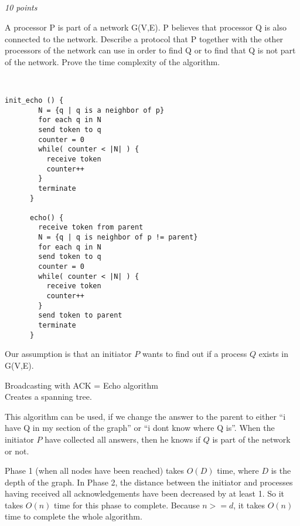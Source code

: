 \documentclass[a4paper]{article}
\newcommand{\points}[1]{\subsection{} \textit{#1 points}\\}
\newcommand{\question}[2][]{
  \parbox[t]{\textwidth}{
    \ifthenelse{\equal{#1}{}}{}{#1)}
    \parbox[t]{0.95\textwidth}{#2}}\\}
\newcommand{\solution}[2][]{
  \ifthenelse{\equal{#1}{} \or \equal{#1}{a}}{\\[3pt]\textit{Solution: }\\[0.1cm]}{}
  \parbox[t]{\textwidth}{
    \ifthenelse{\equal{#1}{}}{}{#1)}
    \parbox[t]{0.95\textwidth}{#2}}\\
}
\begin{document}
\points{10}
\question{
  A processor P is part of a network G(V,E). P believes that processor
  Q is also connected to the network. Describe a protocol that P
  together with the other processors of the network can use in order to
  find Q or to find that Q is not part of the network. Prove the time
  complexity of the algorithm.
}
%
\begin{lrbox}{\userinput}
  \begin{minipage}{\linewidth}
    \begin{lstlisting}[mathescape]
      init_echo () {
        N = {q | q is a neighbor of p}
        for each q in N
        send token to q
        counter = 0
        while( counter < |N| ) {
          receive token
          counter++
        }
        terminate
      }

      echo() {
        receive token from parent
        N = {q | q is neighbor of p != parent}
        for each q in N
        send token to q
        counter = 0
        while( counter < |N| ) {
          receive token
          counter++
        }
        send token to parent
        terminate
      }
    \end{lstlisting}
  \end{minipage}
\end{lrbox}
%
\solution{
  Our assumption is that an initiator $P$ wants to find out if a
  process $Q$ exists in G(V,E).


  Broadcasting with ACK = Echo algorithm\\
  Creates a spanning tree.

  \usebox{\userinput}

  This algorithm can be used, if we change the answer to the parent to
  either ``i have Q in my section of the graph'' or ``i dont know
  where Q is''.
  When the initiator $P$ have collected all answers, then he knows if
  $Q$ is part of the network or not.

  Phase 1 (when all nodes have been reached) takes $O(D)$ time, where
  $D$ is the depth of the graph. In Phase 2, the distance between the
  initiator and processes having received all acknowledgements have been
  decreased by at least 1. So it takes $O(n)$ time for this phase to complete.
  Because $ n >= d $, it takes $O(n)$ time to complete the whole
  algorithm.
}
\end{document}
